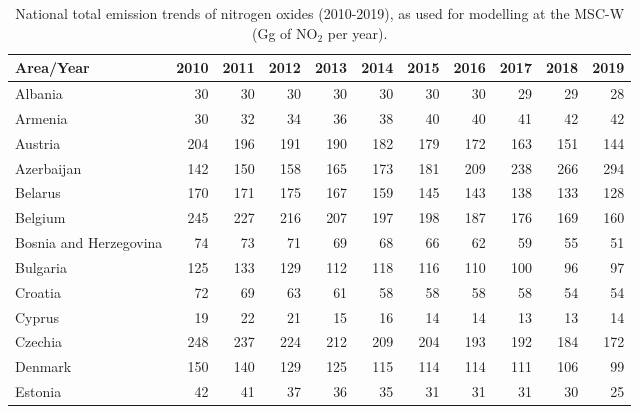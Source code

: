  \begin{table}
 \caption{National total emission trends of nitrogen oxides (2010-2019), as used for modelling at the MSC-W (Gg of NO$_2$ per year).}
 
 \vspace{15pt}
 
 \scriptsize
 \centering
 \begin{tabular}{|l|r|r|r|r|r|r|r|r|r|r|}
 \hline
                     Area/Year&   2010&   2011&   2012&   2013&   2014&   2015&   2016&   2017&   2018&   2019\\\hline\hline
                       Albania&     30&     30&     30&     30&     30&     30&     30&     29&     29&     28\\\hline
                       Armenia&     30&     32&     34&     36&     38&     40&     40&     41&     42&     42\\\hline
                       Austria&    204&    196&    191&    190&    182&    179&    172&    163&    151&    144\\\hline
                    Azerbaijan&    142&    150&    158&    165&    173&    181&    209&    238&    266&    294\\\hline
                       Belarus&    170&    171&    175&    167&    159&    145&    143&    138&    133&    128\\\hline
                       Belgium&    245&    227&    216&    207&    197&    198&    187&    176&    169&    160\\\hline
        Bosnia and Herzegovina&     74&     73&     71&     69&     68&     66&     62&     59&     55&     51\\\hline
                      Bulgaria&    125&    133&    129&    112&    118&    116&    110&    100&     96&     97\\\hline
                       Croatia&     72&     69&     63&     61&     58&     58&     58&     58&     54&     54\\\hline
                        Cyprus&     19&     22&     21&     15&     16&     14&     14&     13&     13&     14\\\hline
                       Czechia&    248&    237&    224&    212&    209&    204&    193&    192&    184&    172\\\hline
                       Denmark&    150&    140&    129&    125&    115&    114&    114&    111&    106&     99\\\hline
                       Estonia&     42&     41&     37&     36&     35&     31&     31&     31&     30&     25\\\hline

\end{tabular}
\end{table}
